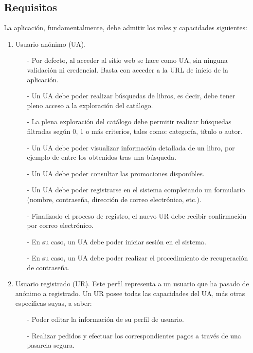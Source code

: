 \documentclass[a4paper]{article}
\begin{document}
        \subsection{Requisitos}
            La aplicación, fundamentalmente, debe admitir los roles y capacidades siguientes:
            \begin{enumerate}
                \item Usuario anónimo (UA).
                \begin{itemize}
                    \item[-] Por defecto, al acceder al sitio web se hace como UA, sin ninguna validación ni credencial. Basta con acceder a la URL de inicio de la aplicación.
                    \item[-] Un UA debe poder realizar búsquedas de libros, es decir, debe tener pleno acceso a la exploración del catálogo.
                    \item[-] La plena exploración del catálogo debe permitir realizar búsque\-das filtradas según 0, 1 o más criterios, tales como: categoría, título o autor.
                    \item[-] Un UA debe poder visualizar información detallada de un libro, por ejemplo de entre los obtenidos tras una búsqueda.
                    \item[-] Un UA debe poder consultar las promociones disponibles.
                    \item[-] Un UA debe poder registrarse en el sistema completando un formulario (nombre, contraseña, dirección de correo electrónico, etc.).
                    \item[-] Finalizado el proceso de registro, el nuevo UR debe recibir confirmación por correo electrónico.
                    \item[-] En su caso, un UA debe poder iniciar sesión en el sistema.
                    \item[-] En su caso, un UA debe poder realizar el procedimiento de recuperación de contraseña.
                \end{itemize}
                \item Usuario registrado (UR). Este perfil representa a un usuario que ha pasado de anónimo a registrado. Un UR posee todas las capacidades del UA, más otras específicas suyas, a saber:
                \begin{itemize}
                    \item[-] Poder editar la información de su perfil de usuario.
                    \item[-] Realizar pedidos y efectuar los correspondientes pagos a través de una pasarela segura.

\end{itemize}
\end{enumerate}
\end{document}
